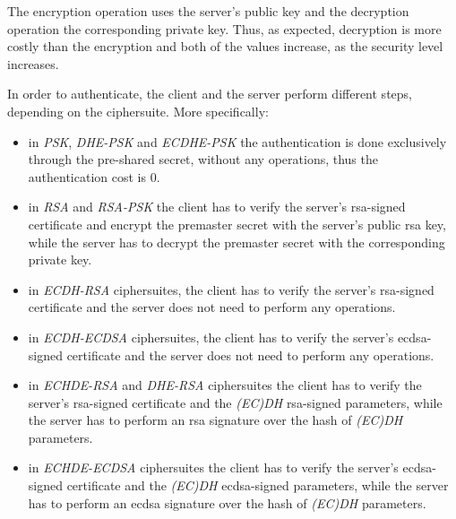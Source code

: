 The encryption operation uses the server's public key and the decryption operation the corresponding private key. Thus, as expected,
decryption is more costly than the encryption and both of the values increase, as the security level increases.

In order to authenticate, the client and the server perform different steps, depending on the ciphersuite. More specifically:

\begin{itemize}
  \item  in \textit{PSK}, \textit{DHE-PSK} and \textit{ECDHE-PSK} the authentication is done exclusively through the pre-shared secret, without any
  operations, thus the authentication cost is $0$.
  \item in \textit{RSA} and \textit{RSA-PSK} the client has to verify the server's \gls{rsa}-signed certificate and encrypt the premaster secret with
  the server's public \gls{rsa} key, while the server has to decrypt the premaster secret with the corresponding private key.
  \item in \textit{ECDH-RSA} ciphersuites, the client has to verify the server's \gls{rsa}-signed certificate and the server does not
  need to perform any operations.
  \item in \textit{ECDH-ECDSA} ciphersuites, the client has to verify the server's \gls{ecdsa}-signed certificate and the server does not
  need to perform any operations.
  \item in \textit{ECHDE-RSA} and \textit{DHE-RSA} ciphersuites the client has to verify the server's \gls{rsa}-signed certificate and
  the \textit{(EC)DH} \gls{rsa}-signed parameters, while the server has to perform an \gls{rsa} signature over the hash of \textit{(EC)DH} parameters.
  \item in \textit{ECHDE-ECDSA} ciphersuites the client has to verify the server's \gls{ecdsa}-signed certificate and
  the \textit{(EC)DH} \gls{ecdsa}-signed parameters, while the server has to perform an \gls{ecdsa} signature over the hash of \textit{(EC)DH} parameters.
\end{itemize}

